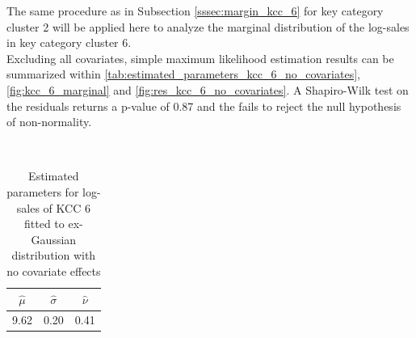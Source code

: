 
The same procedure as in Subsection \ref{sssec:margin_kcc_6} for key category cluster 2 will be applied here to analyze the marginal distribution of the log-sales in key category cluster 6.\\

Excluding all covariates, simple maximum likelihood estimation results can be summarized within \autoref{tab:estimated_parameters_kcc_6_no_covariates}, \autoref{fig:kcc_6_marginal} and \autoref{fig:res_kcc_6_no_covariates}. A Shapiro-Wilk test on the residuals returns a p-value of 0.87 and the fails to reject the null hypothesis of non-normality.
\\



\begin{table}[H]
\setlength\arrayrulewidth{1pt}  
\centering
\begin{adjustbox}{max width=\textwidth}\
\begin{tabular}{|c|c|c|}
\hline
\rowcolor{lightgray} 
$\hat{\mu}$ & $\hat{\sigma}$ & $\hat{\nu}$ \\ \hline
9.62        & 0.20           & 0.41        \\ \hline
\end{tabular}
\end{adjustbox}
\caption{Estimated parameters for log-sales of KCC 6 fitted to ex-Gaussian distribution with no covariate effects}
\label{tab:estimated_parameters_kcc_6_no_covariates}
\end{table}



